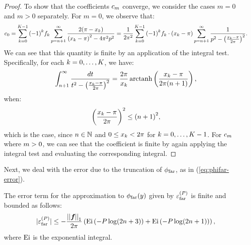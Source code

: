 \begin{proof}
  To show that the coefficients $c_{m}$ converge, we
  consider the cases $m = 0$ and $m > 0$ separately. For $m = 0$, we
  observe that:
  \begin{align*}
    c_{0} = \sum_{{k}=0}^{K{}-1} {(-1)}^k {f}_{k{}} \sum_{p=n+1}^\infty \frac{2(\pi - {x}_{k})}{{({x}_{k} - \pi)}^2 - 4\pi^2p^2} = \frac{1}{2\pi^2} \sum_{{k}=0}^{K{}-1} {(-1)}^k {f}_{k{}} \cdot {({x}_{k} - \pi)} \sum_{p=n+1}^\infty \frac{1}{p^2 - \left(\frac{{x}_{k} - \pi}{2\pi}\right)^2}.
  \end{align*}
  We can see that this quantity is finite by an application of the
  integral test. Specifically, for each
  $k = 0, \hdots, K$, we have:
  \begin{align*}
    \int_{n+1}^\infty \frac{dt}{t^2 - \left(\frac{{x}_{k} - \pi}{2\pi}\right)^2} = \frac{2\pi}{{x}_{k}} \operatorname{arctanh} \left(\frac{{x}_{k} - \pi}{2\pi(n+1)}\right),
  \end{align*}
  when:
  \begin{align*}
    \left(\frac{{x}_{k}-\pi}{2\pi}\right)^2 \leq {(n+1)}^2,
  \end{align*}
  which is the case, since $n \in \mathbb{N}$ and
  $0 \leq {x}_{k} < 2\pi$ for
  $k = 0, \hdots, K-1$. For $c_{m}$ where
  $m > 0$, we can see that the coefficient is finite by again
  applying the integral test and evaluating the corresponding integral.
\end{proof}

Next, we deal with the error due to the truncation of $\phi_{\operatorname{far}}$, as in
(\ref{eq:phifar-error}).

\begin{lemma}\label{lemma:phifar-error}
  The error term for the approximation to $\phi_{\operatorname{far}}(y)$ given by
  ${\varepsilon}^{(P)}_{\operatorname{far}}$ is finite and bounded as follows:
  \begin{align*}
    |{\varepsilon}^{(P)}_{\operatorname{far}}| \leq -\frac{\left|\left|\boldsymbol{{f}_{}}\right|\right|_{1}}{2\pi} \left(\operatorname{Ei} \left(-P \log(2n+3)\right) + \operatorname{Ei} \left(-P \log(2n+1)\right)\right),
  \end{align*}
  where $\operatorname{Ei}$ is the exponential integral.
\end{lemma}

